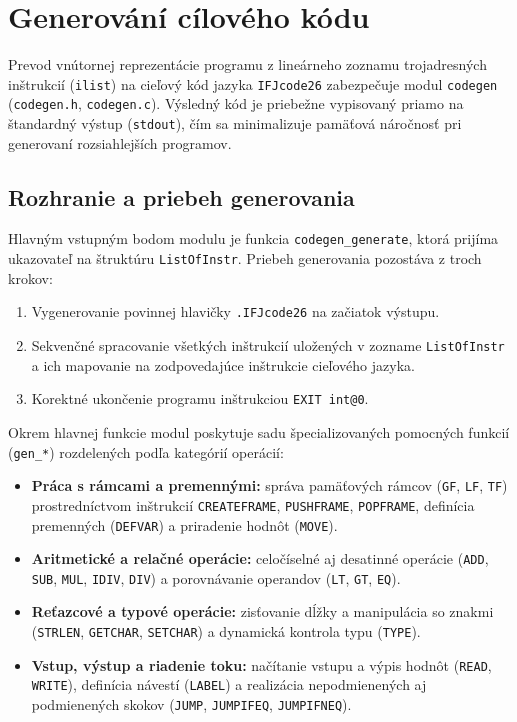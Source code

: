 \section{Generování cílového kódu}

Prevod vnútornej reprezentácie programu z lineárneho zoznamu trojadresných inštrukcií (\texttt{ilist}) na cieľový kód jazyka \texttt{IFJcode26} zabezpečuje modul \texttt{codegen} (\texttt{codegen.h}, \texttt{codegen.c}). Výsledný kód je priebežne vypisovaný priamo na štandardný výstup (\texttt{stdout}), čím sa minimalizuje pamäťová náročnosť pri generovaní rozsiahlejších programov.

\subsection{Rozhranie a priebeh generovania}
Hlavným vstupným bodom modulu je funkcia \texttt{codegen\_generate}, ktorá prijíma ukazovateľ na štruktúru \texttt{ListOfInstr}. Priebeh generovania pozostáva z troch krokov:
\begin{enumerate}
    \item Vygenerovanie povinnej hlavičky \texttt{.IFJcode26} na začiatok výstupu.
    \item Sekvenčné spracovanie všetkých inštrukcií uložených v zozname \texttt{ListOfInstr} a ich mapovanie na zodpovedajúce inštrukcie cieľového jazyka.
    \item Korektné ukončenie programu inštrukciou \texttt{EXIT int@0}.
\end{enumerate}

Okrem hlavnej funkcie modul poskytuje sadu špecializovaných pomocných funkcií (\texttt{gen\_*}) rozdelených podľa kategórií operácií:
\begin{itemize}
    \item \textbf{Práca s rámcami a premennými:} správa pamäťových rámcov (\texttt{GF}, \texttt{LF}, \texttt{TF}) prostredníctvom inštrukcií \texttt{CREATEFRAME}, \texttt{PUSHFRAME}, \texttt{POPFRAME}, definícia premenných (\texttt{DEFVAR}) a priradenie hodnôt (\texttt{MOVE}).
    \item \textbf{Aritmetické a relačné operácie:} celočíselné aj desatinné operácie (\texttt{ADD}, \texttt{SUB}, \texttt{MUL}, \texttt{IDIV}, \texttt{DIV}) a porovnávanie operandov (\texttt{LT}, \texttt{GT}, \texttt{EQ}).
    \item \textbf{Reťazcové a typové operácie:} zisťovanie dĺžky a manipulácia so znakmi (\texttt{STRLEN}, \texttt{GETCHAR}, \texttt{SETCHAR}) a dynamická kontrola typu (\texttt{TYPE}).
    \item \textbf{Vstup, výstup a riadenie toku:} načítanie vstupu a výpis hodnôt (\texttt{READ}, \texttt{WRITE}), definícia návestí (\texttt{LABEL}) a realizácia nepodmienených aj podmienených skokov (\texttt{JUMP}, \texttt{JUMPIFEQ}, \texttt{JUMPIFNEQ}).
\end{itemize}

